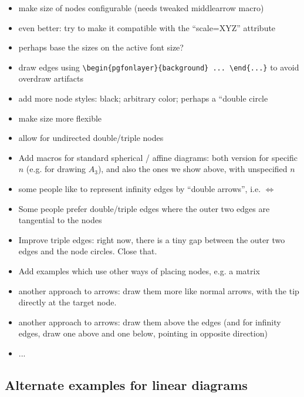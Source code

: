 \documentclass[a4paper,10pt]{scrartcl}
\begin{document}
\begin{itemize}
\item make size of nodes configurable (needs tweaked middlearrow macro)
\item even better: try to make it compatible with the ``scale=XYZ'' attribute
\item perhaps base the sizes on the active font size?
\item draw edges using \verb|\begin{pgfonlayer}{background} ... \end{...}|  to avoid overdraw artifacts
\item add more node styles: black; arbitrary color; perhaps a ``double circle
\item make size more flexible
\item allow for undirected double/triple nodes
\item Add macros for standard spherical / affine diagrams: both version for specific $n$ (e.g. for drawing
$A_3$), and also the ones we show above, with unspecified $n$
\item some people like to represent infinity edges by ``double arrows'', i.e. $\Leftrightarrow$
\item Some people prefer double/triple edges where the outer two edges are tangential to the nodes
\item Improve triple edges: right now, there is a tiny gap between the outer two edges and the node circles.
Close that.
\item Add examples which use other ways of placing nodes, e.g. a matrix
\item another approach to arrows: draw them more like normal arrows, with the tip directly at the target node.
\item another approach to arrows: draw them above the edges (and for infinity edges, draw one above and one below, pointing in opposite direction)
\item ...
\end{itemize}

\subsection*{Alternate examples for linear diagrams}
\end{document}
